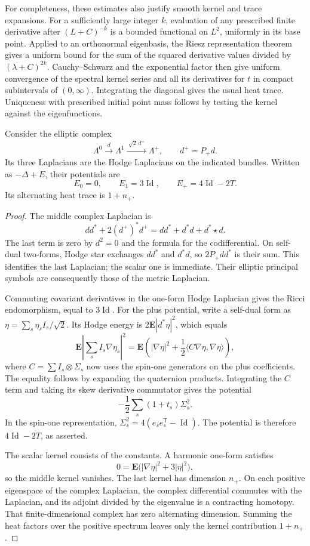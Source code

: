For completeness, these estimates also justify smooth kernel
and trace expansions. For a sufficiently large integer $k$,
evaluation of any prescribed finite derivative after
$(L+C)^{-k}$ is a bounded functional on $L^2$, uniformly in
its base point. Applied to an orthonormal eigenbasis, the
Riesz representation theorem gives a uniform bound for the
sum of the squared derivative values divided by
$(\lambda+C)^{2k}$. Cauchy--Schwarz and the exponential factor
then give uniform convergence of the spectral kernel series
and all its derivatives for $t$ in compact subintervals of
$(0,\infty)$. Integrating the diagonal gives the usual heat
trace. Uniqueness with prescribed initial point mass follows
by testing the kernel against the eigenfunctions.

\begin{lemma}
\label{lem:form-complex-laplacians}
Consider the elliptic complex
\[
 \Lambda^0\xrightarrow{\ d\ }\Lambda^1
       \xrightarrow{\ \sqrt2\,d^+\ }\Lambda^+,
 \qquad d^+=P_+d.
\]
Its three Laplacians are the Hodge Laplacians on the indicated
bundles. Written as $-\Delta+E$, their potentials are
\[
 E_0=0,\qquad E_1=3\operatorname{Id},\qquad
 E_+=4\operatorname{Id}-2T.
\]
Its alternating heat trace is $1+n_+$.
\end{lemma}

\begin{proof}
The middle complex Laplacian is
\[
 dd^*+2(d^+)^*d^+
 =dd^*+d^*d+d^*\!\star d.
\]
The last term is zero by $d^2=0$ and the formula for the
codifferential. On self-dual two-forms, Hodge star exchanges
$dd^*$ and $d^*d$, so $2P_+dd^*$ is their sum. This identifies
the last Laplacian; the scalar one is immediate. Their elliptic
principal symbols are consequently those of the metric Laplacian.

Commuting covariant derivatives in the one-form Hodge Laplacian
gives the Ricci endomorphism, equal to $3\operatorname{Id}$.
For the plus potential, write a self-dual form as
$\eta=\sum_s\eta_s I_s/\sqrt2$. Its Hodge energy is
$2\mathbf E|d^*\eta|^2$, which equals
\[
 \mathbf E\left|\sum_s I_s\nabla\eta_s\right|^2
 =\mathbf E\left(
      |\nabla\eta|^2+\frac12\langle C\nabla\eta,\nabla\eta\rangle
            \right),
\]
where $C=\sum I_s\otimes\Sigma_s$ now uses the spin-one
generators on the plus coefficients. The equality follows by
expanding the quaternion products. Integrating the $C$ term
and taking its skew derivative commutator gives the potential
\[
 -\frac12\sum_s(1+t_s)\Sigma_s^2.
\]
In the spin-one representation,
$\Sigma_s^2=4(e_se_s^{\mathsf T}-\operatorname{Id})$.
The potential is therefore $4\operatorname{Id}-2T$,
as asserted.

The scalar kernel consists of the constants. A harmonic one-form
satisfies
\[
 0=\mathbf E\bigl(|\nabla\eta|^2+3|\eta|^2\bigr),
\]
so the middle kernel vanishes. The last kernel has dimension
$n_+$. On each positive eigenspace of the complex Laplacian,
the complex differential commutes with the Laplacian, and its
adjoint divided by the eigenvalue is a contracting homotopy.
That finite-dimensional complex has zero alternating dimension.
Summing the heat factors over the positive spectrum leaves only
the kernel contribution $1+n_+$.
\end{proof}

